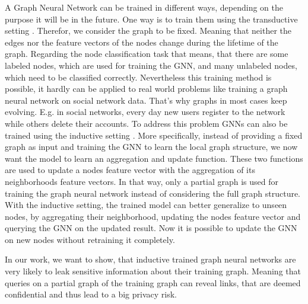		A Graph Neural Network can be trained in different ways, depending on the purpose it will be in the future.
		One way is to train them using the transductive setting \cite{5206871, ZHA2010187, WANG2017218, 10.1007/978-3-642-04174-7_29}.
		Therefor, we consider the graph to be fixed.
		Meaning that neither the edges nor the feature vectors of the nodes change during the lifetime of the graph.
		Regarding the node classification task that means, that there are some labeled nodes, which are used for training the GNN, and many unlabeled nodes, which need to be classified correctly.
		Nevertheless this training method is possible, it hardly can be applied to real world problems like training a graph neural network on social network data.
		That's why graphs in most cases keep evolving.
		E.g. in social networks, every day new users register to the network while others delete their accounts.
		To address this problem GNNs can also be trained using the inductive setting \cite{zeng2020graphsaint, 8519335, zhang2020document}.
		More specifically, instead of providing a fixed graph as input and training the GNN to learn the local graph structure, we now want the model to learn an aggregation and update function.
		These two functions are used to update a nodes feature vector with the aggregation of its neighborhoods feature vectors.
		In that way, only a partial graph is used for training the graph neural network instead of considering the full graph structure.
		With the inductive setting, the trained model can better generalize to unseen nodes, by aggregating their neighborhood, updating the nodes feature vector and querying the GNN on the updated result.
		Now it is possible to update the GNN on new nodes without retraining it completely.

		In our work, we want to show, that inductive trained graph neural networks are very likely to leak sensitive information about their training graph. 
		Meaning that queries on a partial graph of the training graph can reveal links, that are deemed confidential and thus lead to a big privacy risk.

